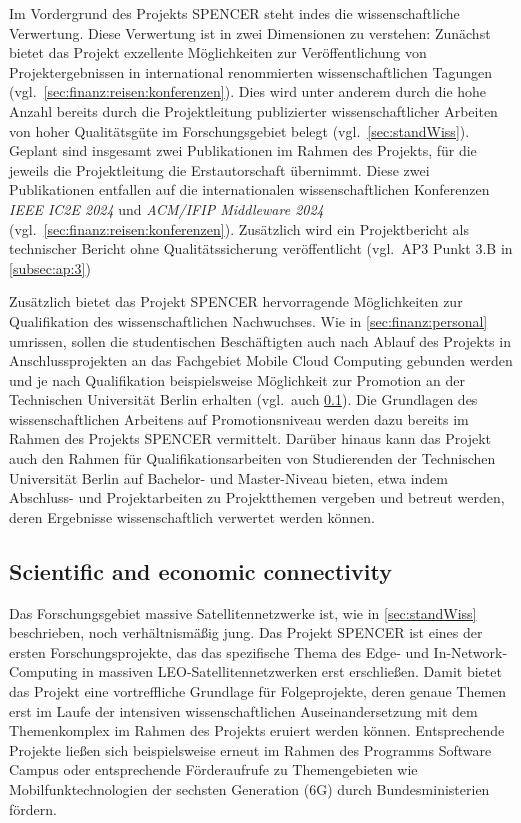 Im Vordergrund des Projekts SPENCER steht indes die wissenschaftliche Verwertung.
Diese Verwertung ist in zwei Dimensionen zu verstehen:
Zunächst bietet das Projekt exzellente Möglichkeiten zur Veröffentlichung von Projektergebnissen in international renommierten wissenschaftlichen Tagungen (vgl.~\cref{sec:finanz:reisen:konferenzen}).
Dies wird unter anderem durch die hohe Anzahl bereits durch die Projektleitung publizierter wissenschaftlicher Arbeiten von hoher Qualitätsgüte im Forschungsgebiet belegt (vgl.~\cref{sec:standWiss}).
Geplant sind insgesamt zwei Publikationen im Rahmen des Projekts, für die jeweils die Projektleitung die Erstautorschaft übernimmt.
Diese zwei Publikationen entfallen auf die internationalen wissenschaftlichen Konferenzen \emph{IEEE IC2E 2024} und \emph{ACM/IFIP Middleware 2024} (vgl.~\cref{sec:finanz:reisen:konferenzen}).
Zusätzlich wird ein Projektbericht als technischer Bericht ohne Qualitätssicherung veröffentlicht (vgl.~AP3 Punkt 3.B in \cref{subsec:ap:3})

Zusätzlich bietet das Projekt SPENCER hervorragende Möglichkeiten zur Qualifikation des wissenschaftlichen Nachwuchses.
Wie in \cref{sec:finanz:personal} umrissen, sollen die studentischen Beschäftigten auch nach Ablauf des Projekts in Anschlussprojekten an das Fachgebiet Mobile Cloud Computing gebunden werden und je nach Qualifikation beispielsweise Möglichkeit zur Promotion an der Technischen Universität Berlin erhalten (vgl.~auch \cref{sec:verwertungsplan:anschluss}).
Die Grundlagen des wissenschaftlichen Arbeitens auf Promotionsniveau werden dazu bereits im Rahmen des Projekts SPENCER vermittelt.
Darüber hinaus kann das Projekt auch den Rahmen für Qualifikationsarbeiten von Studierenden der Technischen Universität Berlin auf Bachelor- und Master-Niveau bieten, etwa indem Abschluss- und Projektarbeiten zu Projektthemen vergeben und betreut werden, deren Ergebnisse wissenschaftlich verwertet werden können.

\subsection{Scientific and economic connectivity}
\label{sec:verwertungsplan:anschluss}

Das Forschungsgebiet massive Satellitennetzwerke ist, wie in \cref{sec:standWiss} beschrieben, noch ver\-hält\-nis\-mä\-ßig jung.
Das Projekt SPENCER ist eines der ersten Forschungsprojekte, das das spezifische Thema des Edge- und In-Network-Computing in massiven LEO-Satellitennetzwerken erst erschließen.
Damit bietet das Projekt eine vortreffliche Grundlage für Folgeprojekte, deren genaue Themen erst im Laufe der intensiven wissenschaftlichen Auseinandersetzung mit dem Themenkomplex im Rahmen des Projekts eruiert werden können.
Entsprechende Projekte ließen sich beispielsweise erneut im Rahmen des Programms Software Campus oder entsprechende Förderaufrufe zu Themengebieten wie Mobilfunktechnologien der sechsten Generation (6G) durch Bundesministerien fördern.

